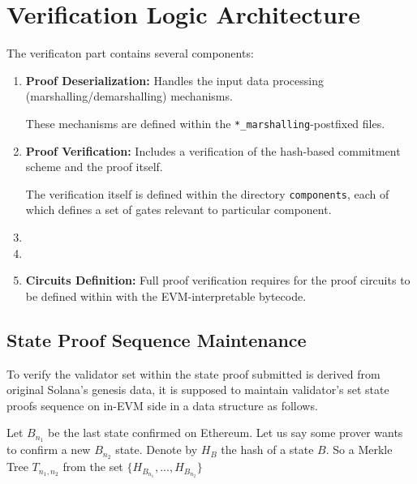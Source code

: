 \section{Verification Logic Architecture}

The verificaton part contains several components:
\begin{enumerate}
    \item \textbf{Proof Deserialization:} Handles the input data processing (marshalling/demarshalling) mechanisms.

    These mechanisms are defined within the \texttt{*\_marshalling}-postfixed files.

    \item \textbf{Proof Verification:} Includes a verification of the hash-based commitment scheme and the proof itself.

    The verification itself is defined within the directory \texttt{components}, each of which defines a set of gates
    relevant to particular component.

    \item \item \item \textbf{Circuits Definition:} Full proof verification requires for the proof circuits to be defined within
    with the EVM-interpretable bytecode.
\end{enumerate}

\subsection{State Proof Sequence Maintenance}
\label{subsec:stateseq}

To verify the validator set within the state proof submitted is derived from 
original Solana's genesis data, it is supposed to maintain validator's set state
proofs sequence on in-EVM side in a data structure as follows.

Let $B_{n_1}$ be the last state confirmed on Ethereum. Let us say some prover 
wants to confirm a new $B_{n_2}$ state. Denote by $H_{B}$ the hash of a state $B$.
So a Merkle Tree $T_{n_1, n_2}$ from the set $\{H_{B_{n_1}}, ..., H_{B_{n_2}}\}$


